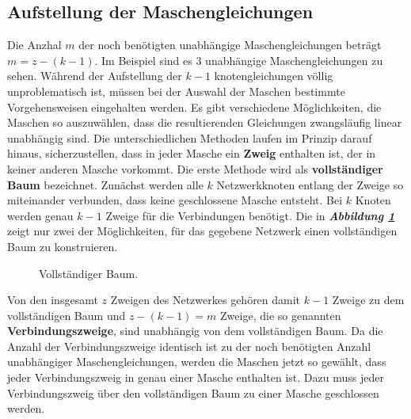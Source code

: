\subsection{Aufstellung der Maschengleichungen}
Die Anzhal $m$ der noch benötigten unabhängige Maschengleichungen beträgt $m=z-\left(k-1\right)$. Im Beispiel sind es 3 unabhängige Maschengleichungen zu sehen. Während der Aufstellung der $k-1$ knotengleichungen völlig unproblematisch ist, müssen bei der Auswahl der Maschen bestimmte Vorgehensweisen eingehalten werden. Es gibt verschiedene Möglichkeiten, die Maschen so auszuwählen, dass die resultierenden Gleichungen zwangsläufig linear unabhängig sind. Die unterschiedlichen Methoden laufen im Prinzip darauf hinaus, sicherzustellen, dass in jeder Masche ein \textbf{Zweig} enthalten ist, der in keiner anderen Masche vorkommt.
\newline\newline
\noindent Die erste Methode wird als \textbf{vollständiger Baum} bezeichnet. Zunächst werden alle $k$ Netzwerkknoten entlang der Zweige so miteinander verbunden, dass keine geschlossene Masche entsteht. Bei $k$ Knoten werden genau $k-1$ Zweige für die Verbindungen benötigt. Die in \textbf{\textit{Abbildung \ref{fig_IIIii}}} zeigt nur zwei der Möglichkeiten, für das gegebene Netzwerk einen vollständigen Baum zu konstruieren. 
\begin{figure}[H]
\centering
\caption{Vollständiger Baum.}
\label{fig_IIIii}
\end{figure}
\noindent Von den insgesamt $z$ Zweigen des Netzwerkes gehören damit $k-1$ Zweige zu dem vollständigen Baum und $z-\left(k-1\right)=m$ Zweige, die so genannten \textbf{Verbindungszweige}, sind unabhängig von dem vollständigen Baum. Da die Anzahl der Verbindungszweige identisch ist zu der noch benötigten Anzahl unabhängiger Maschengleichungen, werden die Maschen jetzt so gewählt, dass jeder Verbindungszweig in genau einer Masche enthalten ist. Dazu muss jeder Verbindungszweig über den vollständigen Baum zu einer Masche geschlossen werden. 
